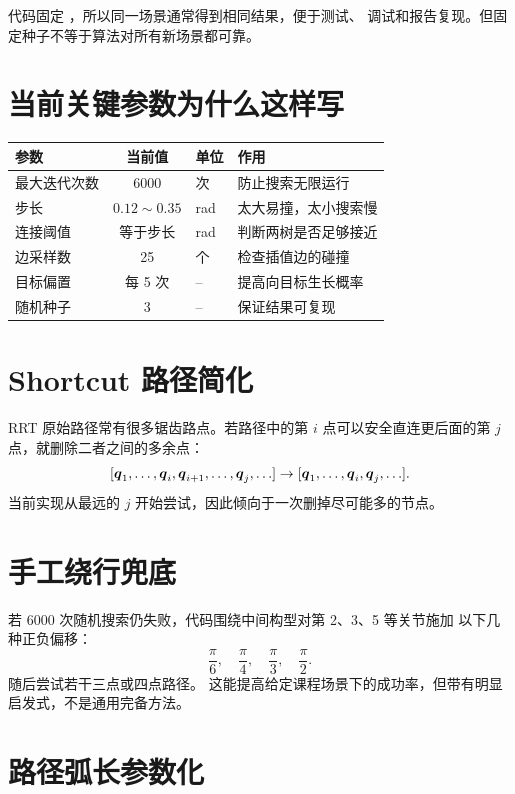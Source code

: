 代码固定 ，所以同一场景通常得到相同结果，便于测试、
调试和报告复现。但固定种子不等于算法对所有新场景都可靠。

\section{当前关键参数为什么这样写}

\begin{table}[H]
\centering
\begin{tabularx}{0.94\textwidth}{lclX}
\toprule
参数 & 当前值 & 单位 & 作用\\
\midrule
最大迭代次数 & 6000 & 次 & 防止搜索无限运行\\
步长 & $0.12\sim0.35$ & rad & 太大易撞，太小搜索慢\\
连接阈值 & 等于步长 & rad & 判断两树是否足够接近\\
边采样数 & 25 & 个 & 检查插值边的碰撞\\
目标偏置 & 每 5 次 & -- & 提高向目标生长概率\\
随机种子 & 3 & -- & 保证结果可复现\\
\bottomrule
\end{tabularx}
\end{table}

\section{Shortcut 路径简化}

RRT 原始路径常有很多锯齿路点。若路径中的第 $i$ 点可以安全直连更后面的第
$j$ 点，就删除二者之间的多余点：
\[
[\boldsymbol{q}_1,\ldots,\boldsymbol{q}_i,\boldsymbol{q}_{i+1},\ldots,\boldsymbol{q}_j,\ldots]
\rightarrow
[\boldsymbol{q}_1,\ldots,\boldsymbol{q}_i,\boldsymbol{q}_j,\ldots].
\]
当前实现从最远的 $j$ 开始尝试，因此倾向于一次删掉尽可能多的节点。

\section{手工绕行兜底}

若 6000 次随机搜索仍失败，代码围绕中间构型对第 2、3、5 等关节施加
以下几种正负偏移：
\[
\frac{\pi}{6},\quad\frac{\pi}{4},\quad
\frac{\pi}{3},\quad\frac{\pi}{2}.
\]
随后尝试若干三点或四点路径。
这能提高给定课程场景下的成功率，但带有明显启发式，不是通用完备方法。

\section{路径弧长参数化}

